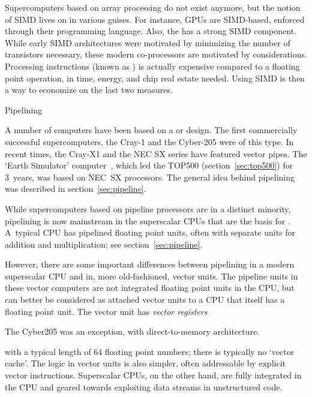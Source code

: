 Supercomputers based on array processing do not exist anymore, but the
notion of SIMD lives on in various guises. For instance, \acp{GPU}
are SIMD-based, enforced through their 
programming language. Also, the  has a
strong SIMD component. While early SIMD architectures were motivated
by minimizing the number of transistors necessary, these modern
co-processors are motivated by 
considerations. Processing instructions (known as
) is actually expensive compared to a
floating point operation, in time, energy, and chip real estate needed.
Using SIMD is then a way to economize on the last two measures.

 {Pipelining}
\label{sec:vector}

A number of computers have been based on a  or  design. The first
commercially successful supercomputers, the Cray-1 and the Cyber-205
were of this type. In recent times, the Cray-X1 and the NEC SX series
have featured vector pipes. The `Earth Simulator'
computer~\cite{Sato2004}, which led the TOP500
(section~\ref{sec:top500}) for 3~years, was based on NEC~SX
processors.  The general idea behind pipelining was described in
section~\ref{sec:pipeline}.

While supercomputers based on pipeline processors are in a distinct
minority, pipelining is now mainstream in the superscalar CPUs that
are the basis for . A~typical CPU has pipelined floating point
units, often with separate units for addition and multiplication; see
section~\ref{sec:pipeline}.

However, there are some important differences between pipelining in a
modern superscalar CPU and in, more old-fashioned, vector units.  The
pipeline units in these vector computers are not integrated floating
point units in the CPU, but can better be considered as attached
vector units to a CPU that itself has a floating point unit. The
vector unit has \emph{vector registers}
\begin{footnoteenv}
  {The Cyber205 was an exception, with direct-to-memory architecture.}
\end{footnoteenv}
with a typical
length of 64 floating point numbers; there is typically no `vector
cache'. The logic in vector units is also simpler, often addressable
by explicit vector instructions. Superscalar CPUs, on the other hand,
are fully integrated in the CPU and geared towards exploiting data
streams in unstructured code.

